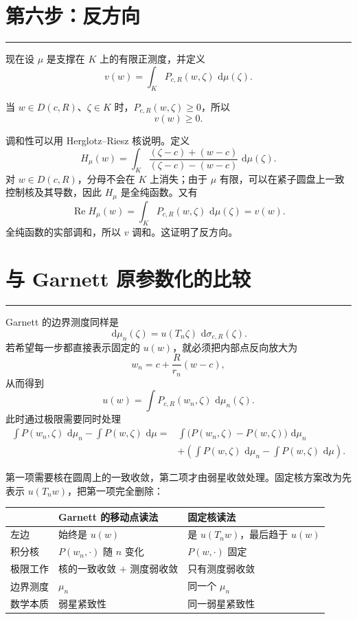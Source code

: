 \documentclass[11pt,a4paper]{article}
\theoremstyle{cnplain}
\theoremstyle{definition}
\newcommand{\dd}{\,\mathrm d}
\newcommand{\sectionrule}{\par\vspace{-0.35em}\noindent\color{blue!55}\rule{\linewidth}{0.5pt}\color{black}\vspace{0.35em}}
\begin{document}
\section{第六步：反方向}
\sectionrule

现在设 $\mu$ 是支撑在 $K$ 上的有限正测度，并定义
\[
  v(w)=\int_K P_{c,R}(w,\zeta)\,\dd\mu(\zeta).
\]

当 $w\in D(c,R)$、$\zeta\in K$ 时，$P_{c,R}(w,\zeta)\ge0$，所以
\[
  v(w)\ge0.
\]

调和性可以用 Herglotz--Riesz 核说明。定义
\[
  H_\mu(w)=\int_K
  \frac{(\zeta-c)+(w-c)}{(\zeta-c)-(w-c)}\,\dd\mu(\zeta).
\]
对 $w\in D(c,R)$，分母不会在 $K$ 上消失；由于 $\mu$ 有限，可以在紧子圆盘上一致控制核及其导数，因此 $H_\mu$ 是全纯函数。又有
\[
  \operatorname{Re}H_\mu(w)
  =\int_K P_{c,R}(w,\zeta)\,\dd\mu(\zeta)
  =v(w).
\]
全纯函数的实部调和，所以 $v$ 调和。这证明了反方向。

\section{与 Garnett 原参数化的比较}
\sectionrule

Garnett 的边界测度同样是
\[
  \dd\mu_n(\zeta)=u(T_n\zeta)\,\dd\sigma_{c,R}(\zeta).
\]
若希望每一步都直接表示固定的 $u(w)$，就必须把内部点反向放大为
\[
  w_n=c+\frac{R}{r_n}(w-c),
\]
从而得到
\[
  u(w)=\int P_{c,R}(w_n,\zeta)\,\dd\mu_n(\zeta).
\]
此时通过极限需要同时处理
\[
\begin{split}
  \int P(w_n,\zeta)\,\dd\mu_n
  -\int P(w,\zeta)\,\dd\mu
  ={}&\int\bigl(P(w_n,\zeta)-P(w,\zeta)\bigr)\,\dd\mu_n\\
  &+\left(\int P(w,\zeta)\,\dd\mu_n
  -\int P(w,\zeta)\,\dd\mu\right).
\end{split}
\]

第一项需要核在圆周上的一致收敛，第二项才由弱星收敛处理。固定核方案改为先表示 $u(T_nw)$，把第一项完全删除：

\begin{center}
\begin{tabularx}{0.92\linewidth}{>{\raggedright\arraybackslash}p{3.2cm}XX}
\toprule
 & Garnett 的移动点读法 & 固定核读法 \\
\midrule
左边 & 始终是 $u(w)$ & 是 $u(T_nw)$，最后趋于 $u(w)$ \\
积分核 & $P(w_n,\cdot)$ 随 $n$ 变化 & $P(w,\cdot)$ 固定 \\
极限工作 & 核的一致收敛 $+$ 测度弱收敛 & 只有测度弱收敛 \\
边界测度 & $\mu_n$ & 同一个 $\mu_n$ \\
数学本质 & 弱星紧致性 & 同一弱星紧致性 \\
\bottomrule
\end{tabularx}
\end{center}
\end{document}
